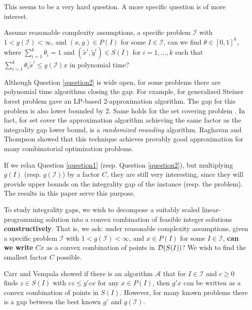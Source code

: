 This seems to be a very hard question. A more specific question is of more interest.

\begin{question}\label{question2}
	Assume reasonable complexity assumptions, a specific problem $\mathcal{I}$ with  $1<g({\mathcal{I}})<\infty$, and $(x,y)\in P(I)$ for some $I\in \mathcal{I}$, can we find $\theta \in [0,1]^k$, where $\sum_{i=1}^{k}\theta_i =1$ and $(\tilde{x}^i,\tilde{y}^i)\in S(I)$ for $i=1,\ldots,k$ such that $\sum_{i=1}^{k}\theta_i \tilde{x}^i\leq g(\mathcal{I})x$ in polynomial time?
\end{question}
Although Question \ref{question2} is wide open, for some problems there are polynomial time algorithms closing the gap. For example, for generalized Steiner forest problem \cite{jain} gave an LP-based 2-approximation algorithm. The gap for this problem is also lower bounded by 2. Same holds for the set covering problem \cite{randomizedrounding}. In fact, for set cover the approximation algorithm achieving the same factor as the integrality gap lower bound, is a \textit{randomized rounding} algorithm. Raghavan and Thompson \cite{randomizedrounding} showed that this technique achieves provably good approximation for many combinatorial optimization problems.  

If we relax Question \ref{question1} (resp. Question \ref{question2}), but multiplying $g(I)$ (resp. $g(\mathcal{I})$) by a factor $C$, they are still very interesting, since they will provide upper bounds on the integrality gap of the instance (resp. the problem). The results in this paper serve this purpose.
\fi

To study integrality gaps, we wish to decompose a suitably scaled linear-programming solution into a convex combination of feasible integer solutions {\bf constructively}. That is, we ask: under reasonable complexity assumptions, given a specific problem $\mathcal{I}$ with  $1<g(\mathcal{I})<\infty$, and $x\in P(I)$ for some $I\in \mathcal{I}$, \textbf{can we write} $Cx$ as a convex combination of points in $\operatorname{\mathcal{D}}(S(I))$? We wish to find the smallest factor $C$ possible.

Carr and Vempala \cite{metarounding} showed if there is an algorithm $\mathcal{A}$ that for $I\in \mathcal{I}$ and $c\geq 0$ finds $z\in S(I)$ with $cz\leq g'cx$ for any $x\in P(I)$, then $g'x$ can be written as a convex combination of points in $S(I)$. However, for many known problems there is a gap between the best known $g'$ and $g(\mathcal{I})$. 

